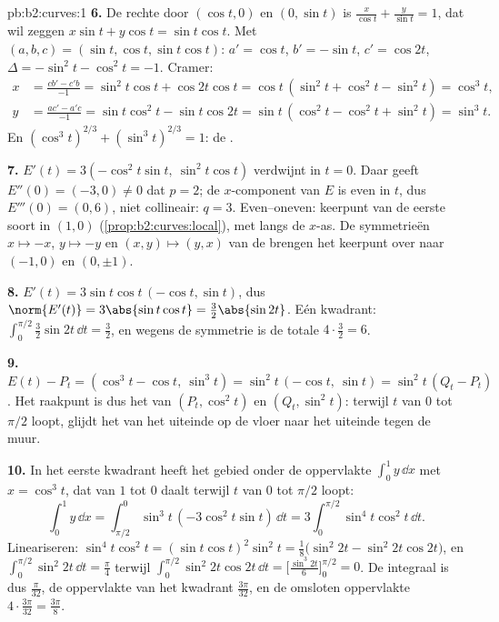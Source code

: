 \begin{solution}{pb:b2:curves:1}
\textbf{6.} De rechte door $(\cos t, 0)$ en $(0, \sin t)$ is
$\frac x{\cos t} + \frac y{\sin t} = 1$, dat wil zeggen $x\sin t +
y\cos t = \sin t\cos t$. Met $(a, b, c) = (\sin t, \cos t, \sin
t\cos t)$: $a' = \cos t$, $b' = -\sin t$, $c' = \cos 2t$, $\Delta =
-\sin^2 t - \cos^2 t = -1$. Cramer:
\begin{align*}
x &= \frac{cb' - c'b}{-1} = \sin^2 t\cos t + \cos 2t\cos t
= \cos t\,(\sin^2 t + \cos^2 t - \sin^2 t) = \cos^3 t,\\
y &= \frac{ac' - a'c}{-1} = \sin t\cos^2 t - \sin t\cos 2t
= \sin t\,(\cos^2 t - \cos^2 t + \sin^2 t) = \sin^3 t .
\end{align*}
En $(\cos^3t)^{2/3} + (\sin^3t)^{2/3} = 1$: de .

\textbf{7.} $E'(t) = 3(-\cos^2 t\sin t,\ \sin^2 t\cos t)$ verdwijnt
in $t = 0$. Daar geeft $E''(0) = (-3, 0) \neq 0$ dat $p = 2$; de
$x$-component van $E$ is even in $t$, dus $E'''(0) = (0, 6)$, niet
collineair: $q = 3$. Even--oneven: keerpunt van de eerste soort in
$(1, 0)$ (\cref{prop:b2:curves:local}), met  langs de
$x$-as. De symmetrieën $x \mapsto -x$, $y \mapsto -y$ en $(x, y)
\mapsto (y, x)$ van de  brengen het keerpunt over naar
$(-1, 0)$ en $(0, \pm1)$.

\textbf{8.} $E'(t) = 3\sin t\cos t\,(-\cos t, \sin t)$, dus
$\norm{E'(t)} = 3\abs{\sin t\cos t} = \tfrac32\abs{\sin 2t}$. Eén
kwadrant: $\int_0^{\pi/2}\tfrac32\sin 2t\,\dd t = \tfrac32$, en
wegens de symmetrie is de totale  $4 \cdot \tfrac32 = 6$.

\textbf{9.} $E(t) - P_t = (\cos^3 t - \cos t,\ \sin^3 t) = \sin^2
t\,(-\cos t,\ \sin t) = \sin^2 t\,(Q_t - P_t)$. Het raakpunt is dus
het  van $(P_t, \cos^2 t)$ en $(Q_t, \sin^2 t)$: terwijl
$t$ van $0$ tot $\pi/2$ loopt, glijdt het van het uiteinde op de
vloer naar het uiteinde tegen de muur.

\textbf{10.} In het eerste kwadrant heeft het gebied onder de
 oppervlakte $\int_0^1 y\,\dd x$ met $x = \cos^3 t$, dat
van $1$ tot $0$ daalt terwijl $t$ van $0$ tot $\pi/2$ loopt:
\[
\int_0^1 y\,\dd x
= \int_{\pi/2}^{0}\sin^3 t\,(-3\cos^2 t\sin t)\,\dd t
= 3\int_0^{\pi/2}\sin^4 t\cos^2 t\,\dd t .
\]
Lineariseren: $\sin^4 t\cos^2 t = (\sin t\cos t)^2\sin^2 t =
\tfrac18\bigl(\sin^2 2t - \sin^2 2t\cos 2t\bigr)$, en
$\int_0^{\pi/2}\sin^2 2t\,\dd t = \tfrac\pi4$ terwijl
$\int_0^{\pi/2}\sin^2 2t\cos 2t\,\dd t = \bigl[\tfrac{\sin^3
2t}6\bigr]_0^{\pi/2} = 0$. De integraal is dus $\tfrac\pi{32}$, de
oppervlakte van het kwadrant $\tfrac{3\pi}{32}$, en de omsloten
oppervlakte $4 \cdot \tfrac{3\pi}{32} = \tfrac{3\pi}8$.


\end{solution}
